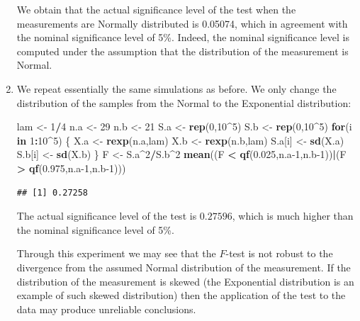 \documentclass[]{krantz}
\makeatletter
\newenvironment{Shaded}{\begin{snugshade}}{\end{snugshade}}
\newcommand{\ControlFlowTok}[1]{\textcolor[rgb]{0.13,0.29,0.53}{\textbf{#1}}}
\newcommand{\DecValTok}[1]{\textcolor[rgb]{0.00,0.00,0.81}{#1}}
\newcommand{\FloatTok}[1]{\textcolor[rgb]{0.00,0.00,0.81}{#1}}
\newcommand{\KeywordTok}[1]{\textcolor[rgb]{0.13,0.29,0.53}{\textbf{#1}}}
\newcommand{\NormalTok}[1]{#1}
\newcommand{\OperatorTok}[1]{\textcolor[rgb]{0.81,0.36,0.00}{\textbf{#1}}}
\newcommand{\StringTok}[1]{\textcolor[rgb]{0.31,0.60,0.02}{#1}}
\newenvironment{kframe}{%
\medskip{}
\setlength{\fboxsep}{.8em}
 \def\at@end@of@kframe{}%
 \ifinner\ifhmode%
  \def\at@end@of@kframe{\end{minipage}}%
  \begin{minipage}{\columnwidth}%
 \fi\fi%
 \def\FrameCommand##1{\hskip\@totalleftmargin \hskip-\fboxsep
 \colorbox{shadecolor}{##1}\hskip-\fboxsep
     \hskip-\linewidth \hskip-\@totalleftmargin \hskip\columnwidth}%
 \MakeFramed {\advance\hsize-\width
   \@totalleftmargin\z@ \linewidth\hsize
   \@setminipage}}%
 {\par\unskip\endMakeFramed%
 \at@end@of@kframe}
\renewenvironment{Shaded}{\begin{kframe}}{\end{kframe}}
\theoremstyle{definition}
\theoremstyle{definition}
\theoremstyle{definition}
\theoremstyle{remark}
\makeatother
\begin{document}
\begin{enumerate}
  We obtain that the actual significance level of the test when the
  measurements are Normally distributed is 0.05074, which in agreement
  with the nominal significance level of 5\%. Indeed, the nominal
  significance level is computed under the assumption that the
  distribution of the measurement is Normal.
\item
  We repeat essentially the same
  simulations as before. We only change the distribution of the samples
  from the Normal to the Exponential distribution:

\begin{Shaded}
\begin{Highlighting}[]
\NormalTok{lam <-}\StringTok{ }\DecValTok{1}\OperatorTok{/}\DecValTok{4}
\NormalTok{n.a <-}\StringTok{ }\DecValTok{29}
\NormalTok{n.b <-}\StringTok{ }\DecValTok{21}
\NormalTok{S.a <-}\StringTok{ }\KeywordTok{rep}\NormalTok{(}\DecValTok{0}\NormalTok{,}\DecValTok{10}\OperatorTok{^}\DecValTok{5}\NormalTok{)}
\NormalTok{S.b <-}\StringTok{ }\KeywordTok{rep}\NormalTok{(}\DecValTok{0}\NormalTok{,}\DecValTok{10}\OperatorTok{^}\DecValTok{5}\NormalTok{)}
\ControlFlowTok{for}\NormalTok{(i }\ControlFlowTok{in} \DecValTok{1}\OperatorTok{:}\DecValTok{10}\OperatorTok{^}\DecValTok{5}\NormalTok{) \{}
\NormalTok{  X.a <-}\StringTok{ }\KeywordTok{rexp}\NormalTok{(n.a,lam)}
\NormalTok{  X.b <-}\StringTok{ }\KeywordTok{rexp}\NormalTok{(n.b,lam)}
\NormalTok{  S.a[i] <-}\StringTok{ }\KeywordTok{sd}\NormalTok{(X.a)}
\NormalTok{  S.b[i] <-}\StringTok{ }\KeywordTok{sd}\NormalTok{(X.b)}
\NormalTok{\}}
\NormalTok{F <-}\StringTok{ }\NormalTok{S.a}\OperatorTok{^}\DecValTok{2}\OperatorTok{/}\NormalTok{S.b}\OperatorTok{^}\DecValTok{2}
\KeywordTok{mean}\NormalTok{((F }\OperatorTok{<}\StringTok{ }\KeywordTok{qf}\NormalTok{(}\FloatTok{0.025}\NormalTok{,n.a}\DecValTok{-1}\NormalTok{,n.b}\DecValTok{-1}\NormalTok{))}\OperatorTok{|}\NormalTok{(F }\OperatorTok{>}\StringTok{ }\KeywordTok{qf}\NormalTok{(}\FloatTok{0.975}\NormalTok{,n.a}\DecValTok{-1}\NormalTok{,n.b}\DecValTok{-1}\NormalTok{)))}
\end{Highlighting}
\end{Shaded}

\begin{verbatim}
## [1] 0.27258
\end{verbatim}

  The actual significance level of the test is \(0.27596\), which is much
  higher than the nominal significance level of 5\%.

  Through this experiment we may see that the \(F\)-test is not robust to
  the divergence from the assumed Normal distribution of the measurement.
  If the distribution of the measurement is skewed (the Exponential
  distribution is an example of such skewed distribution) then the
  application of the test to the data may produce unreliable conclusions.
\end{enumerate}
\end{document}
